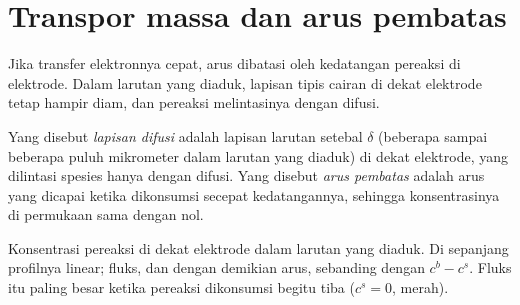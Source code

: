 \section{Transpor massa dan arus pembatas}

Jika transfer elektronnya cepat, arus dibatasi oleh kedatangan pereaksi di
elektrode. Dalam larutan yang diaduk, lapisan tipis cairan di dekat
elektrode tetap hampir diam, dan pereaksi melintasinya dengan difusi.

\begin{definition}\label{def:b2:current-potential-curves:limiting-current}
Yang disebut \emph{lapisan difusi} adalah lapisan
larutan setebal $\delta$ (beberapa sampai beberapa puluh mikrometer dalam
larutan yang diaduk) di dekat elektrode, yang dilintasi spesies hanya
dengan difusi. Yang disebut \emph{arus pembatas}
adalah arus yang dicapai ketika  dikonsumsi secepat
kedatangannya, sehingga konsentrasinya di permukaan sama dengan nol.
\end{definition}

\begin{omfigure}

{\small Konsentrasi pereaksi di dekat elektrode dalam larutan yang diaduk.
Di sepanjang  profilnya linear; fluks, dan dengan demikian
arus, sebanding dengan $c^b - c^s$. Fluks itu paling besar ketika pereaksi
dikonsumsi begitu tiba ($c^s = 0$, merah).}
\end{omfigure}

